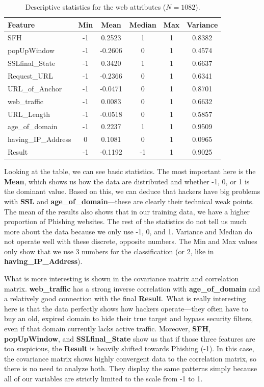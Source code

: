 \documentclass[11pt,a4paper]{article}
\begin{document}
\vspace{0.2cm} 

\begin{table}[H] 
\centering
\caption{Descriptive statistics for the web attributes ($N = 1082$).}
\label{tab:descriptive_stats}
\begin{tabular}{lccccc}
\toprule
\textbf{Feature} & \textbf{Min} & \textbf{Mean} & \textbf{Median} & \textbf{Max} & \textbf{Variance} \\
\midrule
SFH                 & -1 &  0.2523 &  1 & 1 & 0.8382 \\
popUpWindow         & -1 & -0.2606 &  0 & 1 & 0.4574 \\
SSLfinal\_State     & -1 &  0.3420 &  1 & 1 & 0.6637 \\
Request\_URL        & -1 & -0.2366 &  0 & 1 & 0.6341 \\
URL\_of\_Anchor      & -1 & -0.0471 &  0 & 1 & 0.8701 \\
web\_traffic        & -1 &  0.0083 &  0 & 1 & 0.6632 \\
URL\_Length         & -1 & -0.0518 &  0 & 1 & 0.5857 \\
age\_of\_domain      & -1 &  0.2237 &  1 & 1 & 0.9509 \\
having\_IP\_Address   &  0 &  0.1081 &  0 & 1 & 0.0965 \\
Result              & -1 & -0.1192 & -1 & 1 & 0.9025 \\
\bottomrule
\end{tabular}
\end{table}

Looking at the table, we can see basic statistics. The most important here is the \textbf{Mean}, which shows us how the data are distributed and whether -1, 0, or 1 is the dominant value. Based on this, we can deduce that hackers have big problems with \textbf{SSL} and \textbf{age\_of\_domain}—these are clearly their technical weak points. The mean of the results also shows that in our training data, we have a higher proportion of Phishing websites. 
The rest of the statistics do not tell us much more about the data because we only use -1, 0, and 1. Variance and Median do not operate well with these discrete, opposite numbers. The Min and Max values only show that we use 3 numbers for the classification (or 2, like in \textbf{having\_IP\_Address}).

What is more interesting is shown in the covariance matrix and correlation matrix. \textbf{web\_traffic} has a strong inverse correlation with \textbf{age\_of\_domain} and a relatively good connection with the final \textbf{Result}. What is really interesting here is that the data perfectly shows how hackers operate—they often have to buy an old, expired domain to hide their true target and bypass security filters, even if that domain currently lacks active traffic. Moreover, \textbf{SFH}, \textbf{popUpWindow}, and \textbf{SSLfinal\_State} show us that if those three features are too suspicious, the \textbf{Result} is heavily shifted towards Phishing (-1). In this case, the covariance matrix shows highly convergent data to the correlation matrix, so there is no need to analyze both. They display the same patterns simply because all of our variables are strictly limited to the scale from -1 to 1.
\end{document}
